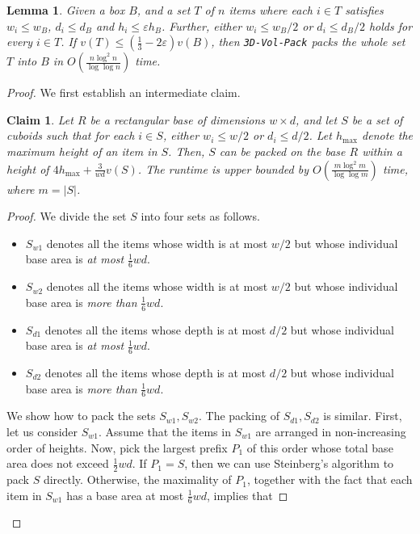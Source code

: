 \documentclass[10pt,a4paper]{amsart}
\newcommand{\kvn}[1]{#1}
\newcommand{\kvnr}[1]{}
\newcommand{\abs}[1]{\left|#1\right|}               %
\renewcommand{\epsilon}{\varepsilon} %
\newtheorem{lemma}[theorem]{Lemma}
\newtheorem{claim}[theorem]{Claim}
\theoremstyle{definition}
\begin{document}
\begin{lemma}
\label{lem:steinberg}
    Given a box $B$, and a set $T$ \kvn{of $n$} items where each $i\in T$ satisfies $w_i \le w_B$, $d_i \le d_B$ and $h_i \le \epsilon h_B$. Further, either $w_i \le w_B/2$ 
    or $d_i \le d_B/2$ holds for every $i\in T$. If $v(T) \le \left(\frac{1}{3}-2\epsilon\right)v(B)$, then \texttt{3D-Vol-Pack} packs the whole set $T$ into $B$ in $O\left(\frac{n \log^2 n}{\log \log n}\right)$ time.
\end{lemma}
\begin{proof}
We first establish an intermediate claim.
\begin{claim}
    \label{lem:steinberg-layers-height}
    Let $R$ be a rectangular base of dimensions $w\times d$, and let $S$ be a set of cuboids such that for each $i\in S$, either $w_i \le w/2$ or $d_i \le d/2$. 
    Let $h_{\max}$ denote the maximum height of an item in $S$. Then, $S$ can be packed on the base $R$ within a height of $4 h_{\max}+\frac{3}{wd}v(S)$. 
    \kvn{The runtime is upper bounded by $O(\frac{m \log^2 m}{\log \log m})$ time, where $m=\abs{S}$.}
\end{claim}
\begin{proof}
    We divide the set $S$ into four sets as follows.
    \begin{itemize}
        \item $S_{w1}$ denotes all the items whose width is at most $w/2$ but whose individual base area is {\em at most} $\frac16wd$.
        \item $S_{w2}$ denotes all the items whose width is at most $w/2$ but whose individual base area is {\em more than} $\frac16wd$.
        \item $S_{d1}$ denotes all the items whose depth is at most $d/2$ but whose individual base area is {\em at most} $\frac16wd$.
        \item $S_{d2}$ denotes all the items whose depth is at most $d/2$ but whose individual base area is {\em more than} $\frac16wd$.
    \end{itemize}
    We show how to pack the sets $S_{w1},S_{w2}$. The packing of $S_{d1},S_{d2}$ is similar. First, let us consider $S_{w1}$. 
    Assume that the items in $S_{w1}$ are arranged in non-increasing order of heights. Now, pick the largest prefix $P_1$
    of this order whose total base area does not exceed $\frac12wd$.
    \kvn{If $P_1=S$, then we can use Steinberg's algorithm to pack $S$ directly.}
    \kvn{Otherwise, }the maximality of $P_1$, together with the fact that each item in $S_{w1}$ has a base area at most $\frac16wd$, implies that

\end{proof}
\end{proof}
\end{document}
